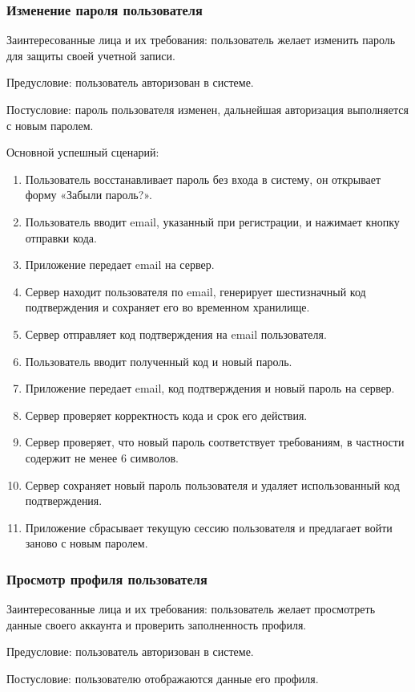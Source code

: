 \subsubsection{Изменение пароля пользователя}
Заинтересованные лица и их требования: пользователь желает изменить пароль для защиты своей учетной записи.

Предусловие: пользователь авторизован в системе.

Постусловие: пароль пользователя изменен, дальнейшая авторизация выполняется с новым паролем.

Основной успешный сценарий:
\begin{enumerate}
    \item Пользователь восстанавливает пароль без входа в систему, он открывает форму «Забыли пароль?».
    \item Пользователь вводит email, указанный при регистрации, и нажимает кнопку отправки кода.
    \item Приложение передает email на сервер.
    \item Сервер находит пользователя по email, генерирует шестизначный код подтверждения и сохраняет его во временном хранилище.
    \item Сервер отправляет код подтверждения на email пользователя.
    \item Пользователь вводит полученный код и новый пароль.
    \item Приложение передает email, код подтверждения и новый пароль на сервер.
    \item Сервер проверяет корректность кода и срок его действия.
    \item Сервер проверяет, что новый пароль соответствует требованиям, в частности содержит не менее 6 символов.
    \item Сервер сохраняет новый пароль пользователя и удаляет использованный код подтверждения.
    \item Приложение сбрасывает текущую сессию пользователя и предлагает войти заново с новым паролем.
\end{enumerate}
\subsubsection{Просмотр профиля пользователя}
Заинтересованные лица и их требования: пользователь желает просмотреть данные своего аккаунта и проверить заполненность профиля.

Предусловие: пользователь авторизован в системе.

Постусловие: пользователю отображаются данные его профиля.

